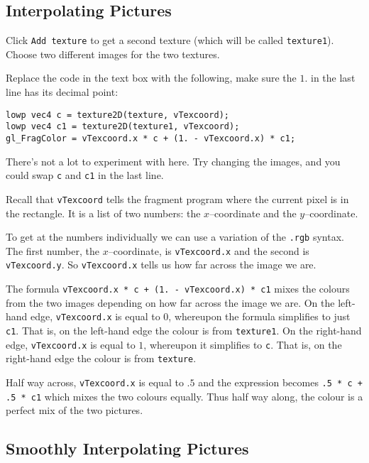 \documentclass[
  html5,%
  mathml,%
  use filename%
]{internet}
\begin{document}
\subsection{Interpolating Pictures}

Click \verb+Add texture+ to get a second texture (which will be called \verb+texture1+).
Choose two different images for the two textures.

Replace the code in the text box with the following, make sure the \(1.\) in the last line has its decimal point:

\begin{tcolorbox}
\begin{verbatim}
lowp vec4 c = texture2D(texture, vTexcoord);
lowp vec4 c1 = texture2D(texture1, vTexcoord);
gl_FragColor = vTexcoord.x * c + (1. - vTexcoord.x) * c1;
\end{verbatim}
\end{tcolorbox}

There's not a lot to experiment with here.
Try changing the images, and you could swap \verb+c+ and \verb+c1+ in the last line.

\begin{tcolorbox}
Recall that \verb+vTexcoord+ tells the fragment program where the current pixel is in the rectangle.
It is a list of two numbers: the \(x\)--coordinate and the \(y\)--coordinate.

To get at the numbers individually we can use a variation of the \verb!.rgb! syntax.
The first number, the \(x\)--coordinate, is \verb+vTexcoord.x+ and the second is \verb+vTexcoord.y+.
So \verb+vTexcoord.x+ tells us how far across the image we are.

The formula \verb!vTexcoord.x * c + (1. - vTexcoord.x) * c1! mixes the colours from the two images depending on how far across the image we are.
On the left-hand edge, \verb+vTexcoord.x+ is equal to \(0\), whereupon the formula simplifies to just \verb+c1+.
That is, on the left-hand edge the colour is from \verb+texture1+.
On the right-hand edge, \verb+vTexcoord.x+ is equal to \(1\), whereupon it simplifies to \verb+c+.
That is, on the right-hand edge the colour is from \verb+texture+.

Half way across, \verb+vTexcoord.x+ is equal to \(.5\) and the expression becomes \verb!.5 * c + .5 * c1! which mixes the two colours equally.
Thus half way along, the colour is a perfect mix of the two pictures.
\end{tcolorbox}

\subsection{Smoothly Interpolating Pictures}
\end{document}

